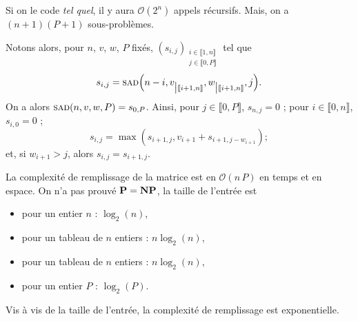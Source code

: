 \begin{rmk}
	Si on le code \textit{tel quel}, il y aura $\mathcal{O}(2^n)$ appels récursifs. Mais, on a $(n+1)(P+1)$\/ sous-problèmes.
\end{rmk}

Notons alors, pour $n$, $v$, $w$, $P$ fixés, $(s_{i,j})_{\substack{i \in \llbracket 1,n \rrbracket\\ j \in \llbracket 0,P \rrbracket}}$\/ tel que \[
	s_{i,j} = \textsc{sad}\Big(n-i, v_{\big|\llbracket i+1,n \rrbracket}, w_{\big|\llbracket i+1,n \rrbracket}, j\Big)
.\]
On a alors $\textsc{sad}(n, v, w, P) = s_{0,P}$. Ainsi, pour $j \in \llbracket 0,P \rrbracket$, $s_{n,j} = 0$ ; pour $i \in \llbracket 0,n \rrbracket$, $s_{i,0} = 0$ ; \[
	s_{i,j} = \max(s_{i+1,j}, v_{i+1} + s_{i+1,j- w_{i+1}})
;\] et, si $w_{i+1} > j$, alors $s_{i,j} = s_{i+1,j}$.

La complexité de remplissage de la matrice est en $\mathcal{O}(n\,P)$\/ en temps et en espace.
On n'a pas prouvé $\text{\textbf{P}} = \text{\textbf{NP}}$, la taille de l'entrée est
\begin{itemize}
	\item pour un entier $n$\/ : $\log_2(n)$,
	\item pour un tableau de $n$\/ entiers : $n \log_2(n)$,
	\item pour un tableau de $n$\/ entiers : $n \log_2(n)$,
	\item pour un entier $P$ : {\color{red}$\log_2(P)$}.
\end{itemize}
Vis à vis de la taille de l'entrée, la complexité de remplissage est {\color{red}exponentielle}.

